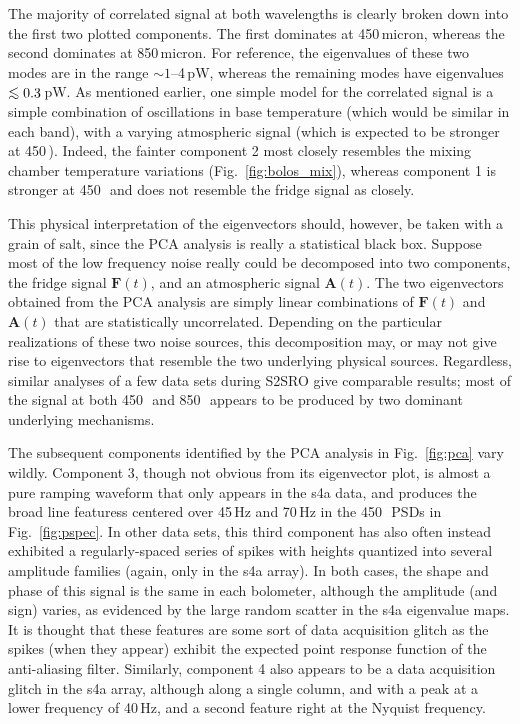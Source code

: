 \documentclass[useAMS,usenatbib,nofootinbib]{mn2e}
\def\lsim{\mathrel{\lower2.5pt\vbox{\lineskip=0pt\baselineskip=0pt
          \hbox{$<$}\hbox{$\sim$}}}}
\begin{document}
The majority of correlated signal at both wavelengths is clearly
broken down into the first two plotted components. The first dominates
at 450\,micron, whereas the second dominates at 850\,micron. For
reference, the eigenvalues of these two modes are in the range
$\sim1$--4\,pW, whereas the remaining modes have eigenvalues
$\lsim0.3$\,pW. As mentioned earlier, one simple model for the
correlated signal is a simple combination of oscillations in base
temperature (which would be similar in each band), with a varying
atmospheric signal (which is expected to be stronger at
450\,\micron). Indeed, the fainter component 2 most closely resembles
the mixing chamber temperature variations (Fig.~\ref{fig:bolos_mix}),
whereas component 1 is stronger at 450\,\micron\ and does not resemble
the fridge signal as closely.

This physical interpretation of the eigenvectors should, however, be
taken with a grain of salt, since the PCA analysis is really a
statistical black box. Suppose most of the low frequency noise really
could be decomposed into two components, the fridge signal
$\mathbf{F}(t)$, and an atmospheric signal $\mathbf{A}(t)$. The two
eigenvectors obtained from the PCA analysis are simply linear
combinations of $\mathbf{F}(t)$ and $\mathbf{A}(t)$ that are
statistically uncorrelated. Depending on the particular realizations
of these two noise sources, this decomposition may, or may not give
rise to eigenvectors that resemble the two underlying physical
sources. Regardless, similar analyses of a few data sets during S2SRO
give comparable results; most of the signal at both 450\,\micron\ and
850\,\micron\ appears to be produced by two dominant underlying
mechanisms.

The subsequent components identified by the PCA analysis in
Fig.~\ref{fig:pca} vary wildly. Component 3, though not obvious from
its eigenvector plot, is almost a pure ramping waveform that only
appears in the s4a data, and produces the broad line featuress
centered over 45\,Hz and 70\,Hz in the 450\,\micron\ PSDs in
Fig.~\ref{fig:pspec}. In other data sets, this third component has
also often instead exhibited a regularly-spaced series of spikes with
heights quantized into several amplitude families (again, only in the
s4a array). In both cases, the shape and phase of this signal is the
same in each bolometer, although the amplitude (and sign) varies, as
evidenced by the large random scatter in the s4a eigenvalue maps. It
is thought that these features are some sort of data acquisition
glitch as the spikes (when they appear) exhibit the expected point
response function of the anti-aliasing filter. Similarly, component 4
also appears to be a data acquisition glitch in the s4a array,
although along a single column, and with a peak at a lower frequency
of 40\,Hz, and a second feature right at the Nyquist frequency.
\end{document}
